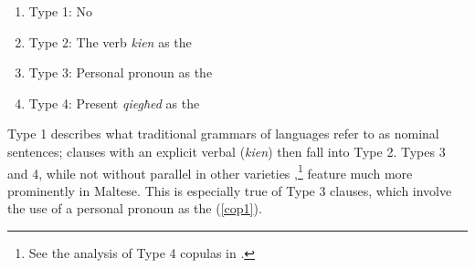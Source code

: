 \documentclass[output=paper]{langsci/langscibook}
\begin{document}
\begin{enumerate}[noitemsep]
	\item[] Type 1: No 
    \item[] Type 2: The verb \textit{kien} as the 
	\item[] Type 3: Personal pronoun as the 

	\item[] Type 4: Present  \textit{qiegħed} as the 
\end{enumerate}
Type 1 describes what traditional grammars of  languages refer to as nominal sentences;  clauses with an explicit verbal  (\textit{kien}) then fall into Type 2. Types 3 and 4, while not without parallel in other varieties ,\footnote{See the analysis of Type 4 copulas in \cite{camillerisadler2018}.} feature much more prominently in Maltese. This is especially true of Type 3  clauses, which involve the use of a personal pronoun as the  (\ref{cop1}).
\end{document}
